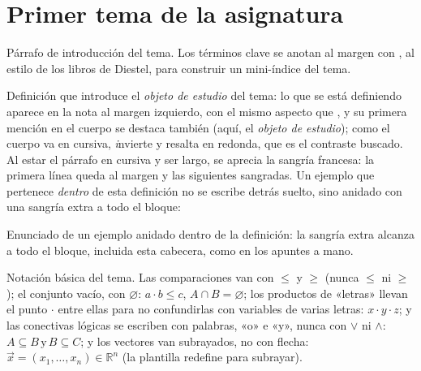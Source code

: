 
\section{Primer tema de la asignatura}\label{tema:uno}

Párrafo de introducción del tema. Los términos clave se anotan al
margen con , al estilo de los
libros de Diestel, para construir un mini-índice del tema.

\begin{definicion}\label{def:objeto}
    Definición que introduce el \emph{objeto de estudio} del tema: lo
    que se está definiendo aparece en la nota al margen izquierdo,
    con el mismo aspecto que \notamargen, y su primera mención en el
    cuerpo se destaca también (aquí, el \emph{objeto de estudio});
    como el cuerpo va en cursiva, \emph invierte y resalta en
    redonda, que es el contraste buscado. Al estar el párrafo en
    cursiva y ser largo, se aprecia la sangría francesa: la primera
    línea queda al margen y las siguientes sangradas. Un ejemplo que
    pertenece \emph{dentro} de esta definición no se escribe detrás
    suelto, sino anidado con una sangría extra a todo el bloque:
    \begin{anidado}
        \begin{ejemplo}\label{ej:anidado}
            Enunciado de un ejemplo anidado dentro de la definición:
            la sangría extra alcanza a todo el bloque, incluida esta
            cabecera, como en los apuntes a mano.
        \end{ejemplo}
    \end{anidado}
\end{definicion}

\begin{notacion}\label{not:basica}
    Notación básica del tema. Las comparaciones van con
    $\leqslant$ y $\geqslant$ (nunca $\leq$ ni $\geq$); el conjunto
    vacío, con $\varnothing$: $a\cdot b\leqslant c$,
    $A\cap B=\varnothing$; los productos de «letras» llevan el punto
    $\cdot$ entre ellas para no confundirlas con variables de varias
    letras: $x\cdot y\cdot z$; y las conectivas lógicas se escriben
    con palabras, «o» e «y», nunca con $\vee$ ni $\wedge$:
    $A\subseteq B \,\text{y}\, B\subseteq C$; y los vectores van
    subrayados, no con flecha:
    $\vec{x}=(x_1,\dots,x_n)\in\mathbb{R}^n$ (la plantilla redefine
    \vec para subrayar).
\end{notacion}

